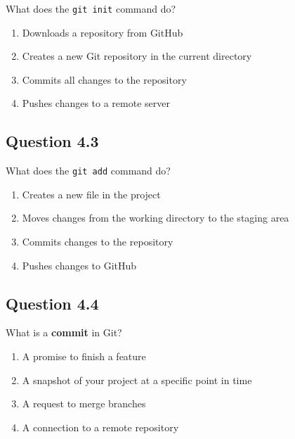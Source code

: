 \documentclass[
  letterpaper,
  DIV=11,
  numbers=noendperiod]{scrreprt}
\providecommand{\tightlist}{%
  \setlength{\itemsep}{0pt}\setlength{\parskip}{0pt}}
\begin{document}
What does the \texttt{git\ init} command do?

\begin{enumerate}
\def\labelenumi{\Alph{enumi})}
\tightlist
\item
  Downloads a repository from GitHub\\
\item
  Creates a new Git repository in the current directory\\
\item
  Commits all changes to the repository\\
\item
  Pushes changes to a remote server
\end{enumerate}

\subsection{Question 4.3}\label{question-4.3}

What does the \texttt{git\ add} command do?

\begin{enumerate}
\def\labelenumi{\Alph{enumi})}
\tightlist
\item
  Creates a new file in the project\\
\item
  Moves changes from the working directory to the staging area\\
\item
  Commits changes to the repository\\
\item
  Pushes changes to GitHub
\end{enumerate}

\subsection{Question 4.4}\label{question-4.4}

What is a \textbf{commit} in Git?

\begin{enumerate}
\def\labelenumi{\Alph{enumi})}
\tightlist
\item
  A promise to finish a feature\\
\item
  A snapshot of your project at a specific point in time\\
\item
  A request to merge branches\\
\item
  A connection to a remote repository
\end{enumerate}
\end{document}
